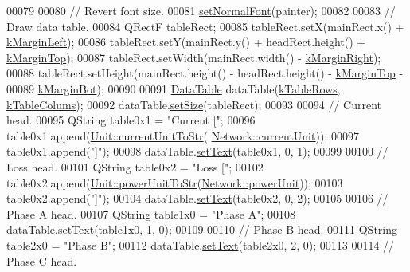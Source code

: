 \begin{DoxyCode}
00079 
00080   \textcolor{comment}{// Revert font size.}
00081   \hyperlink{class_info_line_a4d5084d616c878cb717e8445db0023c1}{setNormalFont}(painter);
00082 
00083   \textcolor{comment}{// Draw data table.}
00084   QRectF tableRect;
00085   tableRect.setX(mainRect.x() + \hyperlink{class_info_line_a68232e6e5e3b63a4b6aced3d99291ad7}{kMarginLeft});
00086   tableRect.setY(mainRect.y() + headRect.height() + \hyperlink{class_info_line_a995100424420038664880195f5e51f50}{kMarginTop});
00087   tableRect.setWidth(mainRect.width() - \hyperlink{class_info_line_a0f0bd713ed9c1c8012bbd29dbd1db75e}{kMarginRight});
00088   tableRect.setHeight(mainRect.height() - headRect.height() - \hyperlink{class_info_line_a995100424420038664880195f5e51f50}{kMarginTop} -
00089                       \hyperlink{class_info_line_ab4bd85105aabcb9d1230225c15873da2}{kMarginBot});
00090 
00091   \hyperlink{class_data_table}{DataTable} dataTable(\hyperlink{class_info_line_a95cdc7a95cde6db7c6faceda995d26b9}{kTableRows}, \hyperlink{class_info_line_a9fc071b08eb913cf3afc623835ad2fd8}{kTableColums});
00092   dataTable.\hyperlink{class_data_table_a8a8cd6f95caaaff148993f8e28eeb703}{setSize}(tableRect);
00093 
00094   \textcolor{comment}{// Current head.}
00095   QString table0x1 = \textcolor{stringliteral}{"Current ["};
00096   table0x1.append(\hyperlink{class_unit_a7bd3ed3edcb18170cd162d384075b651}{Unit::currentUnitToStr}(
      \hyperlink{group___graphics_gac6a26db5fef2b1dd2a00faf6340d1702}{Network::currentUnit}));
00097   table0x1.append(\textcolor{stringliteral}{"]"});
00098   dataTable.\hyperlink{class_data_table_aee0d28c77116b51360f0124a529cb3ff}{setText}(table0x1, 0, 1);
00099 
00100   \textcolor{comment}{// Loss head.}
00101   QString table0x2 = \textcolor{stringliteral}{"Loss ["};
00102   table0x2.append(\hyperlink{class_unit_ad1487441b5a7eb93a3eb0aeebe947725}{Unit::powerUnitToStr}(\hyperlink{group___graphics_ga9504015bc566f4a3d3b4d4a86000293b}{Network::powerUnit}));
00103   table0x2.append(\textcolor{stringliteral}{"]"});
00104   dataTable.\hyperlink{class_data_table_aee0d28c77116b51360f0124a529cb3ff}{setText}(table0x2, 0, 2);
00105 
00106   \textcolor{comment}{// Phase A head.}
00107   QString table1x0 = \textcolor{stringliteral}{"Phase A"};
00108   dataTable.\hyperlink{class_data_table_aee0d28c77116b51360f0124a529cb3ff}{setText}(table1x0, 1, 0);
00109 
00110   \textcolor{comment}{// Phase B head.}
00111   QString table2x0 = \textcolor{stringliteral}{"Phase B"};
00112   dataTable.\hyperlink{class_data_table_aee0d28c77116b51360f0124a529cb3ff}{setText}(table2x0, 2, 0);
00113 
00114   \textcolor{comment}{// Phase C head.}

\end{DoxyCode}
